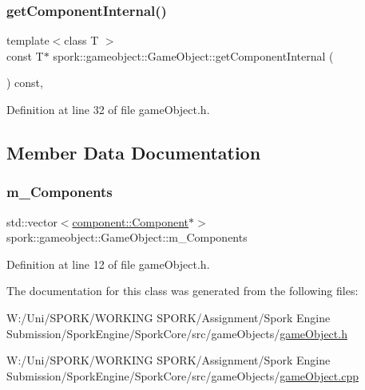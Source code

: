 \mbox{\label{classspork_1_1gameobject_1_1_game_object_a39b2db30001339630f007b4975242f1c}} 
\subsubsection{\texorpdfstring{get\+Component\+Internal()}{getComponentInternal()}}
{\footnotesize\ttfamily template$<$class T $>$ \\
const T$\ast$ spork\+::gameobject\+::\+Game\+Object\+::get\+Component\+Internal (\begin{DoxyParamCaption}{ }\end{DoxyParamCaption}) const\hspace{0.3cm}{\ttfamily [inline]}, {\ttfamily [private]}}



Definition at line 32 of file game\+Object.\+h.



\subsection{Member Data Documentation}
\mbox{\label{classspork_1_1gameobject_1_1_game_object_a672b7675e3e9d5f0a1a35ad0c315020c}} 
\subsubsection{\texorpdfstring{m\+\_\+\+Components}{m\_Components}}
{\footnotesize\ttfamily std\+::vector$<$\hyperlink{classspork_1_1gameobject_1_1component_1_1_component}{component\+::\+Component}$\ast$$>$ spork\+::gameobject\+::\+Game\+Object\+::m\+\_\+\+Components\hspace{0.3cm}{\ttfamily [protected]}}



Definition at line 12 of file game\+Object.\+h.



The documentation for this class was generated from the following files\+:\begin{DoxyCompactItemize}
\item 
W\+:/\+Uni/\+S\+P\+O\+R\+K/\+W\+O\+R\+K\+I\+N\+G S\+P\+O\+R\+K/\+Assignment/\+Spork Engine Submission/\+Spork\+Engine/\+Spork\+Core/src/game\+Objects/\hyperlink{game_object_8h}{game\+Object.\+h}\item 
W\+:/\+Uni/\+S\+P\+O\+R\+K/\+W\+O\+R\+K\+I\+N\+G S\+P\+O\+R\+K/\+Assignment/\+Spork Engine Submission/\+Spork\+Engine/\+Spork\+Core/src/game\+Objects/\hyperlink{game_object_8cpp}{game\+Object.\+cpp}\end{DoxyCompactItemize}
